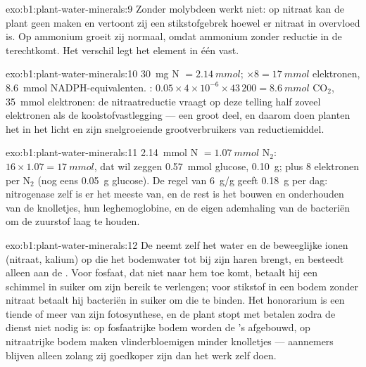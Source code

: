\begin{solution}{exo:b1:plant-water-minerals:9}
Zonder molybdeen werkt  niet: op nitraat kan de plant geen
 maken en vertoont zij een stikstofgebrek hoewel er nitraat in
overvloed is. Op ammonium groeit zij normaal, omdat ammonium zonder
reductie in de  terechtkomt. Het verschil legt het element in één
 vast.
\end{solution}

\begin{solution}{exo:b1:plant-water-minerals:10}
\qty{30}{mg} N $= \qty{2.14}{mmol}$; $\times 8 = \qty{17}{mmol}$
elektronen, \qty{8.6}{mmol} NADPH-equivalenten. : $0.05\times
4\times 10^{-6}\times 43\,200 = \qty{8.6}{mmol}$ $\mathrm{CO_2}$,
\qty{35}{mmol} elektronen: de nitraatreductie vraagt op deze telling half
zoveel elektronen als de koolstofvastlegging --- een groot deel, en daarom
doen planten het in het licht en zijn snelgroeiende  grootverbruikers
van reductiemiddel.
\end{solution}

\begin{solution}{exo:b1:plant-water-minerals:11}
\qty{2.14}{mmol} N $= \qty{1.07}{mmol}$ $\mathrm{N_2}$: 
$16\times 1.07 = \qty{17}{mmol}$, dat wil zeggen \qty{0.57}{mmol} glucose,
\qty{0.10}{g}; plus 8 elektronen per $\mathrm{N_2}$ (nog eens
\qty{0.05}{g} glucose). De regel van \qty{6}{g/g} geeft \qty{0.18}{g} per
dag: nitrogenase zelf is er het meeste van, en de rest is het bouwen en
onderhouden van de knolletjes, hun leghemoglobine, en de eigen ademhaling
van de bacteriën om de zuurstof laag te houden.
\end{solution}

\begin{solution}{exo:b1:plant-water-minerals:12}
De  neemt zelf het water en de beweeglijke ionen (nitraat, kalium)
op die het bodemwater tot bij zijn haren brengt, en besteedt alleen  aan
de . Voor fosfaat, dat niet naar hem toe komt, betaalt hij een
schimmel in suiker om zijn bereik te verlengen; voor stikstof in een bodem
zonder nitraat betaalt hij bacteriën in suiker om die te binden. Het
honorarium is een tiende of meer van zijn fotosynthese, en de plant stopt
met betalen zodra de dienst niet nodig is: op fosfaatrijke bodem worden de
's afgebouwd, op nitraatrijke bodem maken vlinderbloemigen minder
knolletjes --- aannemers blijven alleen zolang zij goedkoper zijn dan het
werk zelf doen.
\end{solution}

